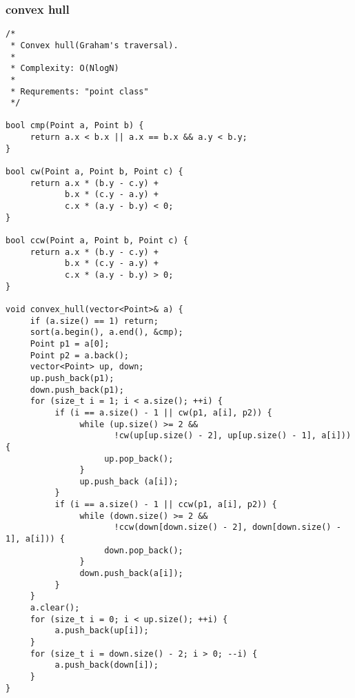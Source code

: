 \subsubsection{convex hull}
\begin{lstlisting}
/*
 * Convex hull(Graham's traversal).
 *
 * Complexity: O(NlogN)
 *
 * Requrements: "point class"
 */

bool cmp(Point a, Point b) {
     return a.x < b.x || a.x == b.x && a.y < b.y;
}

bool cw(Point a, Point b, Point c) {
     return a.x * (b.y - c.y) +
            b.x * (c.y - a.y) +
            c.x * (a.y - b.y) < 0;
}

bool ccw(Point a, Point b, Point c) {
     return a.x * (b.y - c.y) +
            b.x * (c.y - a.y) +
            c.x * (a.y - b.y) > 0;
}

void convex_hull(vector<Point>& a) {
     if (a.size() == 1) return;
     sort(a.begin(), a.end(), &cmp);
     Point p1 = a[0];
     Point p2 = a.back();
     vector<Point> up, down;
     up.push_back(p1);
     down.push_back(p1);
     for (size_t i = 1; i < a.size(); ++i) {
          if (i == a.size() - 1 || cw(p1, a[i], p2)) {
               while (up.size() >= 2 &&
                      !cw(up[up.size() - 2], up[up.size() - 1], a[i])) {
                    up.pop_back();
               }
               up.push_back (a[i]);
          }
          if (i == a.size() - 1 || ccw(p1, a[i], p2)) {
               while (down.size() >= 2 &&
                      !ccw(down[down.size() - 2], down[down.size() - 1], a[i])) {
                    down.pop_back();
               }
               down.push_back(a[i]);
          }
     }
     a.clear();
     for (size_t i = 0; i < up.size(); ++i) {
          a.push_back(up[i]);
     }
     for (size_t i = down.size() - 2; i > 0; --i) {
          a.push_back(down[i]);
     }
}

\end{lstlisting}
